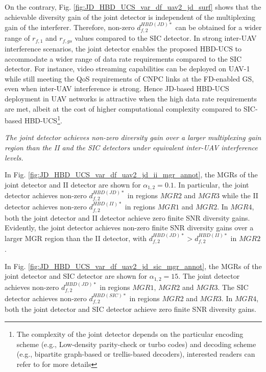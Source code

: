 On the contrary, Fig. \ref{fig:JD_HBD_UCS_var_df_uav2_jd_surf} shows that the achievable diversity gain of the joint detector is independent of the multiplexing gain of the interferer. Therefore, non-zero $d_{f,2}^{HBD(JD)*}$ can be obtained for a wider range of $r_{f,1}$ and $r_{f,gs}$ values compared to the SIC detector. In strong inter-UAV interference scenarios, the joint detector enables the proposed HBD-UCS to accommodate a wider range of data rate requirements compared to the SIC detector. For instance, video streaming capabilities can be deployed on UAV-1 while still meeting the QoS requirements of CNPC links at the FD-enabled GS, even when inter-UAV interference is strong. Hence JD-based HBD-UCS deployment in UAV networks is attractive when the high data rate requirements are met, albeit at the cost of higher computational complexity compared to SIC-based HBD-UCS\footnote{The complexity of the joint detector depends on the particular encoding scheme (e.g., Low-density parity-check or turbo codes) and decoding scheme (e.g., bipartite graph-based or trellis-based decoders), interested readers can refer to \cite{shubhi2017joint} for more details}.
 \newpage
\begin{observation}
\emph{\emph{The joint detector achieves non-zero diversity gain over a larger multiplexing gain region than the II and the SIC detectors under equivalent inter-UAV interference levels.}
}\end{observation}

In Fig. \ref{fig:JD_HBD_UCS_var_df_uav2_jd_ii_mgr_annot}, the MGRs of the joint detector and II detector are shown for $\alpha_{1,2}=0.1$. In particular, the joint detector achieves non-zero $d_{f,2}^{HBD(JD)*}$ in regions $MGR2$ and $MGR3$ while the II detector achieves non-zero $d_{f,2}^{HBD(II)*}$ in regions $MGR1$ and $MGR2$. In $MGR4$, both the joint detector and II detector achieve zero finite SNR diversity gains. Evidently, the joint detector achieves non-zero finite SNR diversity gains over a larger MGR region than the II detector, with $d_{f,2}^{HBD(JD)*} > d_{f,2}^{HBD(II)*}$ in $MGR2$.

In Fig. \ref{fig:JD_HBD_UCS_var_df_uav2_jd_sic_mgr_annot}, the MGRs of the joint detector and SIC detector are shown for $\alpha_{1,2}=15$. The joint detector achieves non-zero $d_{f,2}^{HBD(JD)*}$ in regions $MGR1$, $MGR2$ and $MGR3$. The SIC detector achieves non-zero $d_{f,2}^{HBD(SIC)*}$ in regions $MGR2$ and $MGR3$. In $MGR4$, both the joint detector and SIC detector achieve zero finite SNR diversity gains. 

